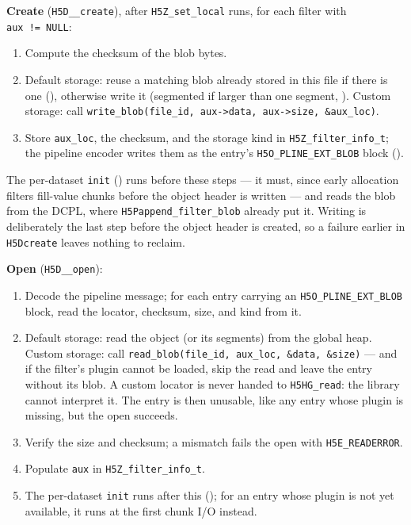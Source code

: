 \documentclass[../RFC-HDFG-2026-003.tex]{subfiles}
\begin{document}
\textbf{Create} (\texttt{H5D\_\_create}), after \texttt{H5Z\_set\_local}
runs, for each filter with \texttt{aux~!=~NULL}:
\begin{enumerate}
\item Compute the checksum of the blob bytes.
\item Default storage: reuse a matching blob already stored in this file
  if there is one (), otherwise write it
  (segmented if larger than one segment,
  ).  Custom storage: call
  \texttt{write\_blob(file\_id, aux->data, aux->size, \&aux\_loc)}.
\item Store \texttt{aux\_loc}, the checksum, and the storage kind in
  \texttt{H5Z\_filter\_info\_t}; the pipeline encoder writes them as the
  entry's \texttt{H5O\_PLINE\_EXT\_BLOB} block ().
\end{enumerate}
\noindent The per-dataset \texttt{init} () runs before these
steps --- it must, since early allocation filters fill-value chunks
before the object header is written --- and reads the blob from the DCPL,
where \texttt{H5Pappend\_filter\_blob} already put it.  Writing is
deliberately the last step before the object header is created, so a
failure earlier in \texttt{H5Dcreate} leaves nothing to reclaim.

\textbf{Open} (\texttt{H5D\_\_open}):
\begin{enumerate}
\item Decode the pipeline message; for each entry carrying an
  \texttt{H5O\_PLINE\_EXT\_BLOB} block, read the locator, checksum, size,
  and kind from it.
\item Default storage: read the object (or its segments) from the global
  heap.  Custom storage: call \texttt{read\_blob(file\_id, aux\_loc,
  \&data, \&size)} --- and if the filter's plugin cannot be loaded, skip
  the read and leave the entry without its blob.  A custom locator is
  never handed to \texttt{H5HG\_read}: the library cannot interpret it.
  The entry is then unusable, like any entry whose plugin is missing,
  but the open succeeds.
\item Verify the size and checksum; a mismatch fails the open with
  \texttt{H5E\_READERROR}.
\item Populate \texttt{aux} in \texttt{H5Z\_filter\_info\_t}.
\item The per-dataset \texttt{init} runs after this
  (); for an entry whose plugin is not yet
  available, it runs at the first chunk I/O instead.
\end{enumerate}
\end{document}
